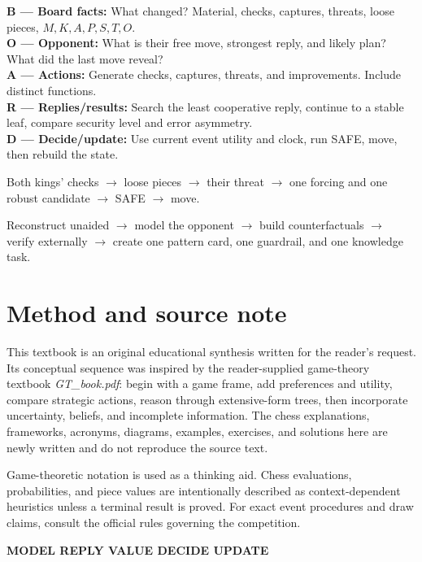 \begin{tcolorbox}[colback=PaleTeal,colframe=Teal,title={BOARD},fonttitle=\sffamily\bfseries]
\textbf{B --- Board facts:} What changed? Material, checks, captures, threats, loose pieces, $M,K,A,P,S,T,O$.\\
\textbf{O --- Opponent:} What is their free move, strongest reply, and likely plan? What did the last move reveal?\\
\textbf{A --- Actions:} Generate checks, captures, threats, and improvements. Include distinct functions.\\
\textbf{R --- Replies/results:} Search the least cooperative reply, continue to a stable leaf, compare security level and error asymmetry.\\
\textbf{D --- Decide/update:} Use current event utility and clock, run SAFE, move, then rebuild the state.
\end{tcolorbox}

\begin{tcolorbox}[colback=PaleGold,colframe=Gold,title={When the clock is low},fonttitle=\sffamily\bfseries]
Both kings' checks $\rightarrow$ loose pieces $\rightarrow$ their threat $\rightarrow$ one forcing and one robust candidate $\rightarrow$ SAFE $\rightarrow$ move.
\end{tcolorbox}

\begin{tcolorbox}[colback=SoftGray,colframe=Navy,title={When reviewing},fonttitle=\sffamily\bfseries]
Reconstruct unaided $\rightarrow$ model the opponent $\rightarrow$ build counterfactuals $\rightarrow$ verify externally $\rightarrow$ create one pattern card, one guardrail, and one knowledge task.
\end{tcolorbox}

\chapter*{Method and source note}

This textbook is an original educational synthesis written for the reader's request. Its conceptual sequence was inspired by the reader-supplied game-theory textbook \emph{GT\_book.pdf}: begin with a game frame, add preferences and utility, compare strategic actions, reason through extensive-form trees, then incorporate uncertainty, beliefs, and incomplete information. The chess explanations, frameworks, acronyms, diagrams, examples, exercises, and solutions here are newly written and do not reproduce the source text.

Game-theoretic notation is used as a thinking aid. Chess evaluations, probabilities, and piece values are intentionally described as context-dependent heuristics unless a terminal result is proved. For exact event procedures and draw claims, consult the official rules governing the competition.

\vfill
\begin{center}
{\sffamily\bfseries\color{Navy}MODEL \quad REPLY \quad VALUE \quad DECIDE \quad UPDATE}
\end{center}
